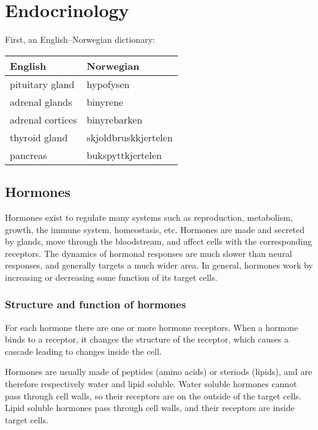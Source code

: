 \section{Endocrinology}
First, an English--Norwegian dictionary:
\begin{table}[htbp]
  \centering
  \begin{tabular}{ll}
    \toprule
    English & Norwegian \\
    \midrule
    pituitary gland & hypofysen \\
    adrenal glands & binyrene \\
    adrenal cortices & binyrebarken \\
    thyroid gland & skjoldbruskkjertelen \\
    pancreas & bukspyttkjertelen \\
    \bottomrule
  \end{tabular}
\end{table}

\subsection{Hormones}
Hormones exist to regulate many systems such as reproduction, metabolism, growth, the immune system, homeostasis, etc. Hormones are made and secreted by glands, move through the bloodstream, and affect cells with the corresponding receptors. The dynamics of hormonal responses are much slower than neural responses, and generally targets a much wider area. In general, hormones work by increasing or decreasing some function of its target cells.

\subsubsection{Structure and function of hormones}
For each hormone there are one or more hormone receptors. When a hormone binds to a receptor, it changes the structure of the receptor, which causes a cascade leading to changes inside the cell.

Hormones are usually made of peptides (amino acids) or steriods (lipids), and are therefore respectively water and lipid soluble. Water soluble hormones cannot pass through cell walls, so their receptors are on the outside of the target cells. Lipid soluble hormones pass through cell walls, and their receptors are inside target cells.

